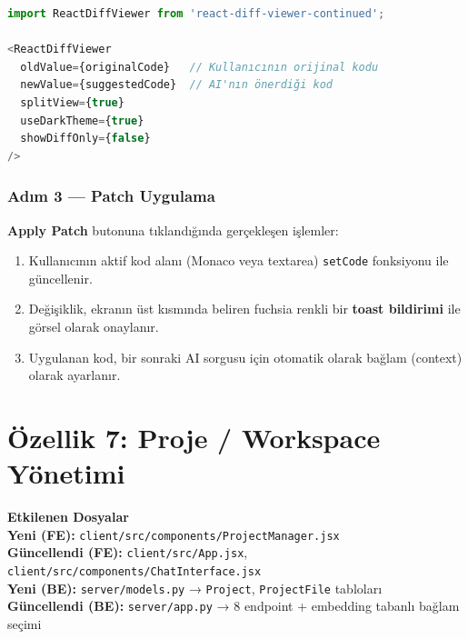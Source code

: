 \documentclass[12pt,a4paper]{article}
\newenvironment{featurebox}[1]{%
  \begin{mdframed}[
    backgroundcolor=bgweek,
    linecolor=borderpurple,
    linewidth=0.8pt,
    innerleftmargin=8pt,
    innerrightmargin=8pt,
    innertopmargin=6pt,
    innerbottommargin=6pt,
    roundcorner=4pt
  ]
  \raggedright
  \noindent\textbf{\small #1}\\[4pt]
}{%
  \end{mdframed}
}
\begin{document}
\begin{lstlisting}[language=JavaScript, caption={ChatInterface.jsx — yan yana diff görünümü}]
import ReactDiffViewer from 'react-diff-viewer-continued';

<ReactDiffViewer
  oldValue={originalCode}   // Kullanıcının orijinal kodu
  newValue={suggestedCode}  // AI'nın önerdiği kod
  splitView={true}
  useDarkTheme={true}
  showDiffOnly={false}
/>
\end{lstlisting}

\subsubsection{Adım 3 — Patch Uygulama}

\textbf{Apply Patch} butonuna tıklandığında gerçekleşen işlemler:

\begin{enumerate}
  \item Kullanıcının aktif kod alanı (Monaco veya textarea) \texttt{setCode} fonksiyonu ile güncellenir.
  \item Değişiklik, ekranın üst kısmında beliren fuchsia renkli bir \textbf{toast bildirimi} ile görsel olarak onaylanır.
  \item Uygulanan kod, bir sonraki AI sorgusu için otomatik olarak bağlam (context) olarak ayarlanır.
\end{enumerate}

\newpage

\section{Özellik 7: Proje / Workspace Yönetimi}

\begin{featurebox}{Etkilenen Dosyalar}
\textbf{Yeni (FE):} \texttt{client/src/components/ProjectManager.jsx}\\
\textbf{Güncellendi (FE):} \texttt{client/src/App.jsx}, \texttt{client/src/components/ChatInterface.jsx}\\[2pt]
\textbf{Yeni (BE):} \texttt{server/models.py} → \texttt{Project}, \texttt{ProjectFile} tabloları\\
\textbf{Güncellendi (BE):} \texttt{server/app.py} → 8 endpoint + embedding tabanlı bağlam seçimi
\end{featurebox}
\end{document}
